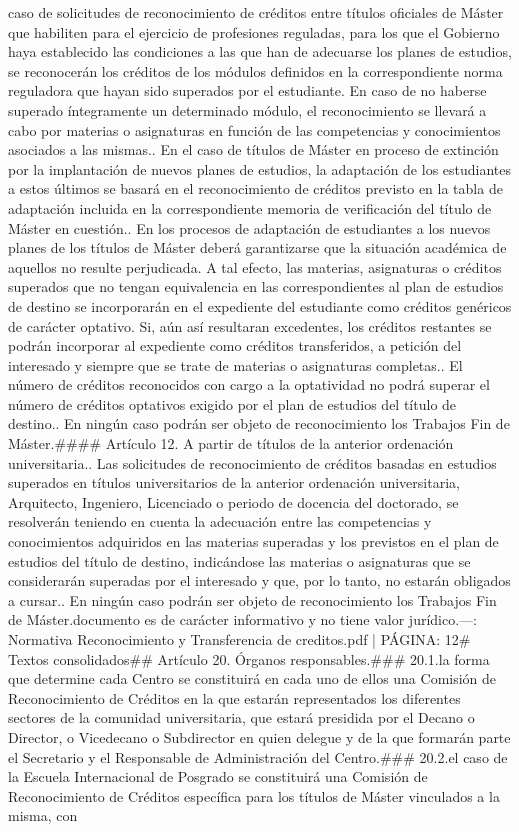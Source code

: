 \documentclass{article}
\begin{document}
\begin{itemize}
caso de solicitudes de reconocimiento de créditos entre títulos oficiales de Máster que habiliten para el ejercicio de profesiones reguladas, para los que el Gobierno haya establecido las condiciones a las que han de adecuarse los planes de estudios, se reconocerán los créditos de los módulos definidos en la correspondiente norma reguladora que hayan sido superados por el estudiante. En caso de no haberse superado íntegramente un determinado módulo, el reconocimiento se llevará a cabo por materias o asignaturas en función de las competencias y conocimientos asociados a las mismas.. En el caso de títulos de Máster en proceso de extinción por la implantación de nuevos planes de estudios, la adaptación de los estudiantes a estos últimos se basará en el reconocimiento de créditos previsto en la tabla de adaptación incluida en la correspondiente memoria de verificación del título de Máster en cuestión.. En los procesos de adaptación de estudiantes a los nuevos planes de los títulos de Máster deberá garantizarse que la situación académica de aquellos no resulte perjudicada. A tal efecto, las materias, asignaturas o créditos superados que no tengan equivalencia en las correspondientes al plan de estudios de destino se incorporarán en el expediente del estudiante como créditos genéricos de carácter optativo. Si, aún así resultaran excedentes, los créditos restantes se podrán incorporar al expediente como créditos transferidos, a petición del interesado y siempre que se trate de materias o asignaturas completas.. El número de créditos reconocidos con cargo a la optatividad no podrá superar el número de créditos optativos exigido por el plan de estudios del título de destino.. En ningún caso podrán ser objeto de reconocimiento los Trabajos Fin de Máster.\n\n#### Artículo 12. A partir de títulos de la anterior ordenación universitaria.. Las solicitudes de reconocimiento de créditos basadas en estudios superados en títulos universitarios de la anterior ordenación universitaria, Arquitecto, Ingeniero, Licenciado o periodo de docencia del doctorado, se resolverán teniendo en cuenta la adecuación entre las competencias y conocimientos adquiridos en las materias superadas y los previstos en el plan de estudios del título de destino, indicándose las materias o asignaturas que se considerarán superadas por el interesado y que, por lo tanto, no estarán obligados a cursar.\n{}. En ningún caso podrán ser objeto de reconocimiento los Trabajos Fin de Máster.\n\nEste documento es de carácter informativo y no tiene valor jurídico.\n\n---\n\nFUENTE: Normativa Reconocimiento y Transferencia de creditos.pdf | PÁGINA: 12\n# Textos consolidados\n\n## Artículo 20. Órganos responsables.\n\n### 20.1.\nEn la forma que determine cada Centro se constituirá en cada uno de ellos una Comisión de Reconocimiento de Créditos en la que estarán representados los diferentes sectores de la comunidad universitaria, que estará presidida por el Decano o Director, o Vicedecano o Subdirector en quien delegue y de la que formarán parte el Secretario y el Responsable de Administración del Centro.\n\n### 20.2.\nEn el caso de la Escuela Internacional de Posgrado se constituirá una Comisión de Reconocimiento de Créditos específica para los títulos de Máster vinculados a la misma, con 
\end{itemize}
\end{document}
